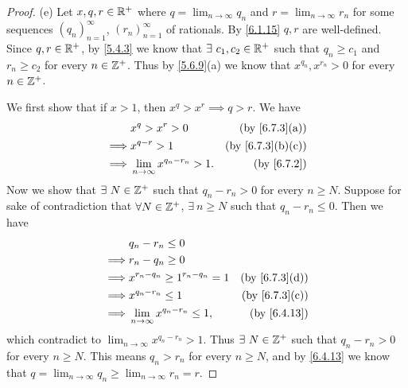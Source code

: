 \begin{proof}{(e)}
  Let \(x, q, r \in \mathbb{R}^+\) where \(q = \lim_{n \to \infty} q_n\) and \(r = \lim_{n \to \infty} r_n\) for some sequences \((q_n)_{n = 1}^\infty\), \((r_n)_{n = 1}^\infty\) of rationals.
  By \cref{6.1.15} \(q, r\) are well-defined.
  Since \(q, r \in \mathbb{R}^+\), by \cref{5.4.3} we know that \(\exists\ c_1, c_2 \in \mathbb{R}^+\) such that \(q_n \geq c_1\) and \(r_n \geq c_2\) for every \(n \in \mathbb{Z}^+\).
  Thus by \cref{5.6.9}(a) we know that \(x^{q_n}, x^{r_n} > 0\) for every \(n \in \mathbb{Z}^+\).

  We first show that if \(x > 1\), then \(x^q > x^r \implies q > r\).
  We have
  \begin{align*}
             & x^q > x^r > 0                          & \text{(by \cref{6.7.3}(a))}    \\
    \implies & x^{q - r} > 1                          & \text{(by \cref{6.7.3}(b)(c))} \\
    \implies & \lim_{n \to \infty} x^{q_n - r_n} > 1. & \text{(by \cref{6.7.2})}       \\
  \end{align*}
  Now we show that \(\exists\ N \in \mathbb{Z}^+\) such that \(q_n - r_n > 0\) for every \(n \geq N\).
  Suppose for sake of contradiction that \(\forall N \in \mathbb{Z}^+\), \(\exists\ n \geq N\) such that \(q_n - r_n \leq 0\).
  Then we have
  \begin{align*}
             & q_n - r_n \leq 0                                                        \\
    \implies & r_n - q_n \geq 0                                                        \\
    \implies & x^{r_n - q_n} \geq 1^{r_n - q_n} = 1      & \text{(by \cref{6.7.3}(d))} \\
    \implies & x^{q_n - r_n} \leq 1                      & \text{(by \cref{6.7.3}(c))} \\
    \implies & \lim_{n \to \infty} x^{q_n - r_n} \leq 1, & \text{(by \cref{6.4.13})}
  \end{align*}
  which contradict to \(\lim_{n \to \infty} x^{q_n - r_n} > 1\).
  Thus \(\exists\ N \in \mathbb{Z}^+\) such that \(q_n - r_n > 0\) for every \(n \geq N\).
  This means \(q_n > r_n\) for every \(n \geq N\), and by \cref{6.4.13} we know that \(q = \lim_{n \to \infty} q_n \geq \lim_{n \to \infty} r_n = r\).


\end{proof}
